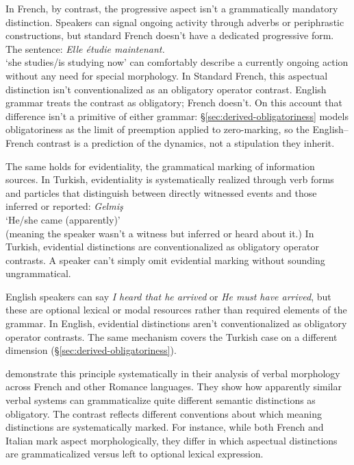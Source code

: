 \documentclass[12pt,letterpaper]{article}
\newcommand{\mention}[1]{\textit{#1}}
\newcommand{\olang}[1]{\textit{#1}}
\begin{document}
In French, by contrast, the progressive aspect isn't a grammatically mandatory distinction. Speakers can signal ongoing activity through adverbs or periphrastic constructions, but standard French doesn't have a dedicated progressive form. The sentence:
\ea
\olang{Elle étudie maintenant.}\\
`she studies/is studying now'
\z
can comfortably describe a currently ongoing action without any need for special morphology. In Standard French, this aspectual distinction isn't conventionalized as an obligatory operator contrast. English grammar treats the contrast as obligatory; French doesn't. On this account that difference isn't a primitive of either grammar: \S\ref{sec:derived-obligatoriness} models obligatoriness as the limit of preemption applied to zero-marking, so the English--French contrast is a prediction of the dynamics, not a stipulation they inherit.

The same holds for evidentiality, the grammatical marking of information sources. In Turkish, evidentiality is systematically realized through verb forms and particles that distinguish between directly witnessed events and those inferred or reported:
\ea
\olang{Gelmiş}\\
`He/she came (apparently)'\\
(meaning the speaker wasn't a witness but inferred or heard about it.)
\z
In Turkish, evidential distinctions are conventionalized as obligatory operator contrasts. A speaker can't simply omit evidential marking without sounding ungrammatical.

English speakers can say \mention{I heard that he arrived} or \mention{He must have arrived}, but these are optional lexical or modal resources rather than required elements of the grammar. In English, evidential distinctions aren't conventionalized as obligatory operator contrasts. The same mechanism covers the Turkish case on a different dimension (\S\ref{sec:derived-obligatoriness}).

\textcite{kilani2005} demonstrate this principle systematically in their analysis of verbal morphology across French and other Romance languages. They show how apparently similar verbal systems can grammaticalize quite different semantic distinctions as obligatory. The contrast reflects different conventions about which meaning distinctions are systematically marked. For instance, while both French and Italian mark aspect morphologically, they differ in which aspectual distinctions are grammaticalized versus left to optional lexical expression.
\end{document}
